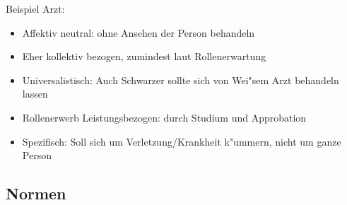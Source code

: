 \begin{itemize}
		Beispiel Arzt:
		\begin{itemize}
			\item
				Affektiv neutral: ohne Ansehen der Person behandeln
			\item
				Eher kollektiv bezogen, zumindest laut Rollenerwartung
			\item
				Universalistisch: Auch Schwarzer sollte sich von Wei"sem Arzt behandeln lassen
			\item
				Rollenerwerb Leistungsbezogen: durch Studium und Approbation
			\item
				Spezifisch: Soll sich um Verletzung/Krankheit k"ummern, nicht um ganze Person
		\end{itemize}
\end{itemize}

\subsection{Normen}
